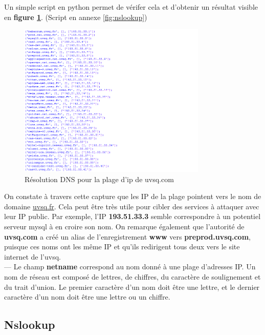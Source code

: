 Un simple script en python permet de vérifer cela et d'obtenir un résultat visible en \textbf{figure \ref{fig:resultatprogpy}}.  (Script en annexe \ref{fig:nslookup})

\begin{figure}[b!]
  \centering
  \setlength\figureheight{7cm}
  \setlength\figurewidth{9cm}
  \includegraphics[width=0.8\textwidth]{oui/images/Whois/script-python.PNG}
  \caption{Résolution DNS pour la plage d'ip de uvsq.com}
  \label{fig:resultatprogpy}
\end{figure}

\noindent On constate à travers cette capture que les IP de la plage pointent vers le nom de domaine \url{uvsq.fr}. Cela peut être très utile pour cibler des services à attaquer avec leur IP public. Par exemple, l'IP \textbf{193.51.33.3} semble correspondre à un potentiel serveur mysql à en croire son nom. On remarque également que l'autorité de \textbf{uvsq.com} a créé un alias de l'enregistrement \textbf{www} vers \textbf{preprod.uvsq.com}, puisque ces noms ont les même IP et qu'ils redirigent tous deux vers le site internet de l'uvsq.\\

\noindent --- Le champ \textbf{netname} correspond au nom donné à une plage d'adresses IP. Un nom de réseau est composé de lettres, de chiffres, du caractère de soulignement et du trait d'union. Le premier caractère d'un nom doit être une lettre, et le dernier caractère d'un nom doit être une lettre ou un chiffre.\\

\subsection{Nslookup}

